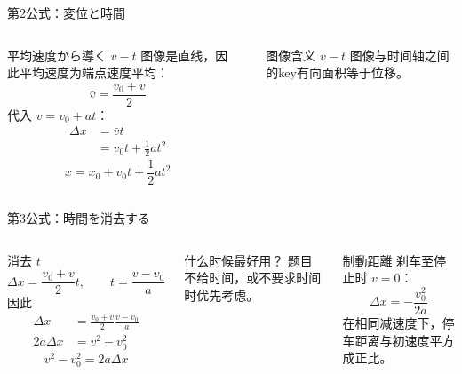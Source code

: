 \documentclass[notheorems,aspectratio=169]{beamer}
\begin{document}
\begin{frame}{第2公式：変位と時間}
  \small
  \begin{columns}[T,onlytextwidth]
    \begin{block}{平均速度から導く}
      $v-t$ 图像是直线，因此平均速度为端点速度平均：
      \[
        \bar v=\frac{v_0+v}{2}
      \]
      代入 $v=v_0+at$：
      \begin{align*}
        \Delta x&=\bar v t\\
        &=v_0t+\frac12at^2
      \end{align*}
      \[
        \boxed{x=x_0+v_0t+\frac12at^2}
      \]
    \end{block}

    \begin{center}
    \end{center}
    \begin{alertblock}{图像含义}
      $v-t$ 图像与时间轴之间的key{有向面积}等于位移。
    \end{alertblock}
  \end{columns}
\end{frame}

\begin{frame}{第3公式：時間を消去する}
  \begin{columns}[T,onlytextwidth]
    \begin{block}{消去 $t$}
      \[
        \Delta x=\frac{v_0+v}{2}t,
        \qquad
        t=\frac{v-v_0}{a}
      \]
      因此
      \begin{align*}
        \Delta x
        &=\frac{v_0+v}{2}\frac{v-v_0}{a}\\
        2a\Delta x&=v^2-v_0^2
      \end{align*}
      \[
        \boxed{v^2-v_0^2=2a\Delta x}
      \]
    \end{block}
    \begin{alertblock}{什么时候最好用？}
      题目不给时间，或不要求时间时优先考虑。
    \end{alertblock}
    \begin{exampleblock}{制動距離}
      刹车至停止时 $v=0$：
      \[
        \Delta x=-\frac{v_0^2}{2a}
      \]
      在相同减速度下，停车距离与初速度平方成正比。
    \end{exampleblock}
  \end{columns}
\end{frame}
\end{document}
